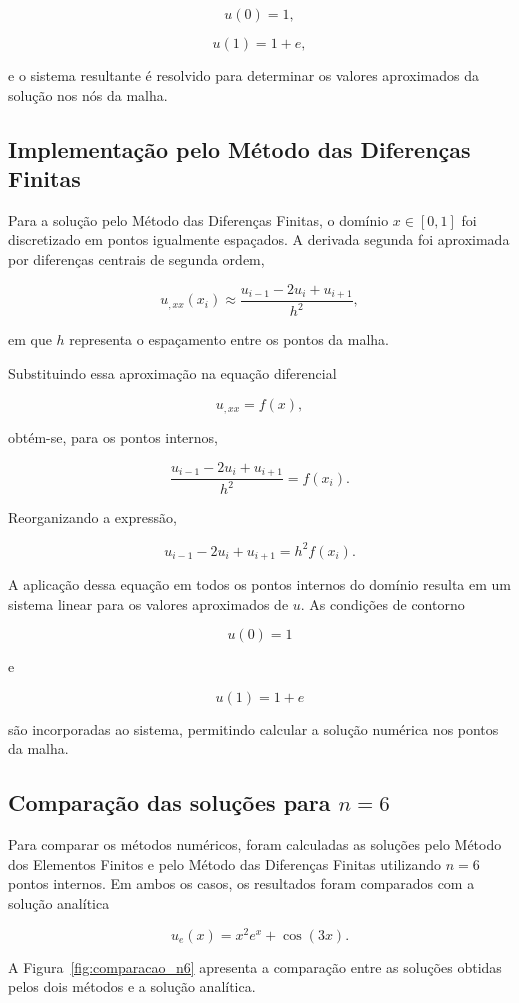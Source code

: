 \[
u(0)=1,
\]

\[
u(1)=1+e,
\]

e o sistema resultante é resolvido para determinar os valores aproximados da solução nos nós da malha.

\subsection{Implementação pelo Método das Diferenças Finitas}

Para a solução pelo Método das Diferenças Finitas, o domínio \(x \in [0,1]\) foi discretizado em pontos igualmente espaçados. A derivada segunda foi aproximada por diferenças centrais de segunda ordem,

\[
u_{,xx}(x_i)
\approx
\frac{u_{i-1}-2u_i+u_{i+1}}{h^2},
\]

em que \(h\) representa o espaçamento entre os pontos da malha.

Substituindo essa aproximação na equação diferencial

\[
u_{,xx}=f(x),
\]

obtém-se, para os pontos internos,

\[
\frac{u_{i-1}-2u_i+u_{i+1}}{h^2}
=
f(x_i).
\]

Reorganizando a expressão,

\[
u_{i-1}-2u_i+u_{i+1}
=
h^2 f(x_i).
\]

A aplicação dessa equação em todos os pontos internos do domínio resulta em um sistema linear para os valores aproximados de \(u\). As condições de contorno

\[
u(0)=1
\]

e

\[
u(1)=1+e
\]

são incorporadas ao sistema, permitindo calcular a solução numérica nos pontos da malha.

\subsection{Comparação das soluções para \(n=6\)}

Para comparar os métodos numéricos, foram calculadas as soluções pelo Método dos Elementos Finitos e pelo Método das Diferenças Finitas utilizando \(n=6\) pontos internos. Em ambos os casos, os resultados foram comparados com a solução analítica

\[
u_e(x)=x^2e^x+\cos(3x).
\]

A Figura~\ref{fig:comparacao_n6} apresenta a comparação entre as soluções obtidas pelos dois métodos e a solução analítica.

